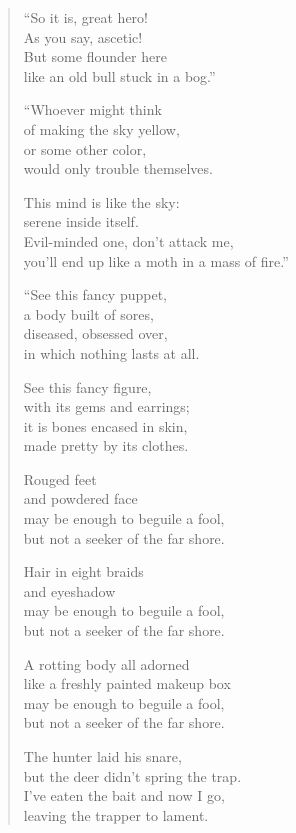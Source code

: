 \documentclass[12pt,openany]{book}%
\begin{document}
\begin{verse}
“So it is, great hero! \\
As you say, ascetic! \\
But some flounder here \\
like an old bull stuck in a bog.” 

“Whoever might think \\
of making the sky yellow, \\
or some other color, \\
would only trouble themselves. 

This mind is like the sky: \\
serene inside itself. \\
Evil-minded one, don’t attack me, \\
you’ll end up like a moth in a mass of fire.” 

“See this fancy puppet, \\
a body built of sores, \\
diseased, obsessed over, \\
in which nothing lasts at all. 

See this fancy figure, \\
with its gems and earrings; \\
it is bones encased in skin, \\
made pretty by its clothes. 

Rouged feet \\
and powdered face \\
may be enough to beguile a fool, \\
but not a seeker of the far shore. 

Hair in eight braids \\
and eyeshadow \\
may be enough to beguile a fool, \\
but not a seeker of the far shore. 

A rotting body all adorned \\
like a freshly painted makeup box \\
may be enough to beguile a fool, \\
but not a seeker of the far shore. 

The hunter laid his snare, \\
but the deer didn’t spring the trap. \\
I’ve eaten the bait and now I go, \\
leaving the trapper to lament. 


\end{verse}
\end{document}
